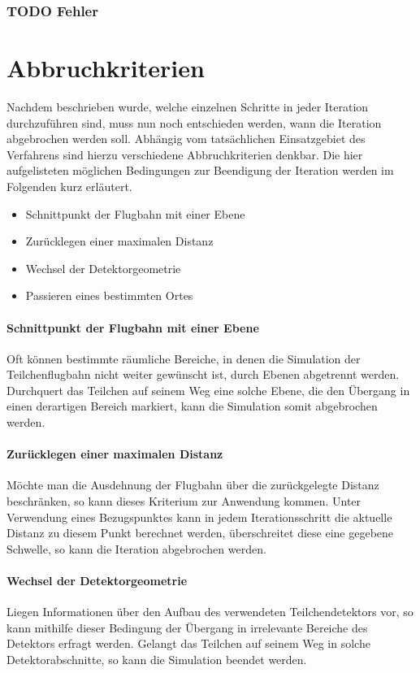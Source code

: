 \subsubsection{TODO Fehler}

\section{Abbruchkriterien}

Nachdem beschrieben wurde, welche einzelnen Schritte in jeder Iteration durchzuf\"uhren sind, muss nun noch entschieden werden,
wann die Iteration abgebrochen werden soll. Abh\"angig vom tats\"achlichen Einsatzgebiet des Verfahrens sind hierzu verschiedene
Abbruchkriterien denkbar.
Die hier aufgelisteten m\"oglichen Bedingungen zur Beendigung der Iteration werden im Folgenden kurz erl\"autert.
\begin{itemize}
\item Schnittpunkt der Flugbahn mit einer Ebene
\item Zur\"ucklegen einer maximalen Distanz
\item Wechsel der Detektorgeometrie
\item Passieren eines bestimmten Ortes
\end{itemize}

\paragraph{Schnittpunkt der Flugbahn mit einer Ebene}
Oft k\"onnen bestimmte r\"aumliche Bereiche, in denen die Simulation der Teilchenflugbahn nicht weiter gew\"unscht ist, durch
Ebenen abgetrennt werden. Durchquert das Teilchen auf seinem Weg eine solche Ebene, die den \"Ubergang in einen derartigen Bereich
markiert, kann die Simulation somit abgebrochen werden.

\paragraph{Zur\"ucklegen einer maximalen Distanz}
M\"ochte man die Ausdehnung der Flugbahn \"uber die zur\"uckgelegte Distanz beschr\"anken, so kann dieses Kriterium zur Anwendung
kommen. Unter Verwendung eines Bezugspunktes kann in jedem Iterationsschritt die aktuelle Distanz zu diesem Punkt berechnet werden,
\"uberschreitet diese eine gegebene Schwelle, so kann die Iteration abgebrochen werden.

\paragraph{Wechsel der Detektorgeometrie}
Liegen Informationen \"uber den Aufbau des verwendeten Teilchendetektors vor, so kann mithilfe dieser Bedingung der \"Ubergang in
irrelevante Bereiche des Detektors erfragt werden. Gelangt das Teilchen auf seinem Weg in solche Detektorabschnitte, so kann die
Simulation beendet werden.

